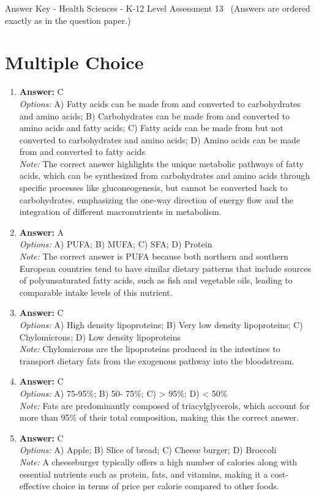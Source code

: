\documentclass[12pt]{article}
\begin{document}
\begin{center}
Answer Key - Health Sciences - K-12 Level Assessment 13 \
\small (Answers are ordered exactly as in the question paper.)
\end{center}

\section*{Multiple Choice}
\begin{enumerate}[label=\arabic*.]
\item \textbf{Answer:} C
\\ \textit{Options:} A) Fatty acids can be made from and converted to carbohydrates and amino acids; B) Carbohydrates can be made from and converted to amino acids and fatty acids; C) Fatty acids can be made from but not converted to carbohydrates and amino acids; D) Amino acids can be made from and converted to fatty acids
\\ \textit{Note:} The correct answer highlights the unique metabolic pathways of fatty acids, which can be synthesized from carbohydrates and amino acids through specific processes like gluconeogenesis, but cannot be converted back to carbohydrates, emphasizing the one-way direction of energy flow and the integration of different macronutrients in metabolism.
\item \textbf{Answer:} A
\\ \textit{Options:} A) PUFA; B) MUFA; C) SFA; D) Protein
\\ \textit{Note:} The correct answer is PUFA because both northern and southern European countries tend to have similar dietary patterns that include sources of polyunsaturated fatty acids, such as fish and vegetable oils, leading to comparable intake levels of this nutrient.
\item \textbf{Answer:} C
\\ \textit{Options:} A) High density lipoproteins; B) Very low density lipoproteins; C) Chylomicrons; D) Low density lipoproteins
\\ \textit{Note:} Chylomicrons are the lipoproteins produced in the intestines to transport dietary fats from the exogenous pathway into the bloodstream.
\item \textbf{Answer:} C
\\ \textit{Options:} A) 75-95\%; B) 50- 75\%; C) \textgreater{} 95\%; D) \textless{} 50\%
\\ \textit{Note:} Fats are predominantly composed of triacylglycerols, which account for more than 95\% of their total composition, making this the correct answer.
\item \textbf{Answer:} C
\\ \textit{Options:} A) Apple; B) Slice of bread; C) Cheese burger; D) Broccoli
\\ \textit{Note:} A cheeseburger typically offers a high number of calories along with essential nutrients such as protein, fats, and vitamins, making it a cost-effective choice in terms of price per calorie compared to other foods.
\end{enumerate}
\end{document}
